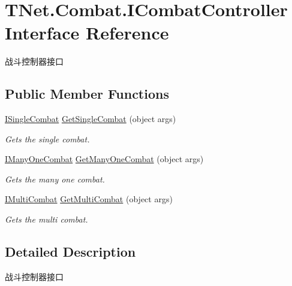 \hypertarget{interface_t_net_1_1_combat_1_1_i_combat_controller}{}\section{T\+Net.\+Combat.\+I\+Combat\+Controller Interface Reference}
\label{interface_t_net_1_1_combat_1_1_i_combat_controller}


战斗控制器接口  


\subsection*{Public Member Functions}
\begin{DoxyCompactItemize}
\item 
\mbox{\hyperlink{interface_t_net_1_1_combat_1_1_i_single_combat}{I\+Single\+Combat}} \mbox{\hyperlink{interface_t_net_1_1_combat_1_1_i_combat_controller_a99d413ee501a9487fba4f65294e0c796}{Get\+Single\+Combat}} (object args)
\begin{DoxyCompactList}\small\item\em Gets the single combat. \end{DoxyCompactList}\item 
\mbox{\hyperlink{interface_t_net_1_1_combat_1_1_i_many_one_combat}{I\+Many\+One\+Combat}} \mbox{\hyperlink{interface_t_net_1_1_combat_1_1_i_combat_controller_a1fb4ab877d18c06278fbab91f5a72cda}{Get\+Many\+One\+Combat}} (object args)
\begin{DoxyCompactList}\small\item\em Gets the many one combat. \end{DoxyCompactList}\item 
\mbox{\hyperlink{interface_t_net_1_1_combat_1_1_i_multi_combat}{I\+Multi\+Combat}} \mbox{\hyperlink{interface_t_net_1_1_combat_1_1_i_combat_controller_a76039d2745233b5dfc24c58b59332cfb}{Get\+Multi\+Combat}} (object args)
\begin{DoxyCompactList}\small\item\em Gets the multi combat. \end{DoxyCompactList}\end{DoxyCompactItemize}


\subsection{Detailed Description}
战斗控制器接口 



